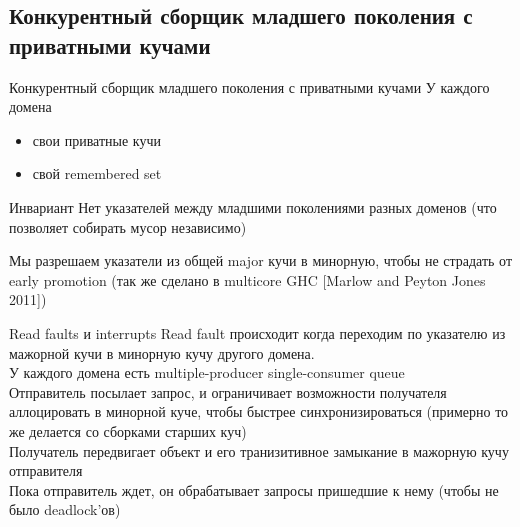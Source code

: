 \documentclass[aspectratio=169
  , xcolor={svgnames} 
  , hyperref={ colorlinks,citecolor=DeepPink4
             , linkcolor=DarkRed,urlcolor=DarkBlue}
  , russian
  ]{beamer}
\theoremstyle{exerciseStyle1}
\begin{document}
\subsection{Конкурентный сборщик младшего поколения с приватными кучами}

\begin{frame}{Конкурентный сборщик младшего поколения с приватными кучами}
У каждого домена 
\begin{itemize}
\item свои приватные кучи
\item свой remembered set
\end{itemize}

\begin{block}{Инвариант}
Нет указателей между младшими поколениями разных доменов 
(что позволяет собирать мусор независимо)
\end{block}

Мы разрешаем указатели из общей major кучи в минорную, чтобы не страдать от 
early promotion (так же сделано в multicore GHC [Marlow and Peyton Jones 2011])


\end{frame}

\begin{frame}{Read faults и interrupts}
Read fault происходит когда переходим по указателю из мажорной кучи в минорную кучу другого домена.\\

У каждого домена есть multiple-producer single-consumer queue\\

Отправитель посылает запрос, и ограничивает возможности получателя аллоцировать в минорной куче, чтобы быстрее синхронизироваться
(примерно то же делается со сборками старших куч)\\

Получатель передвигает объект и его транизитивное замыкание в мажорную кучу отправителя\\

Пока отправитель ждет, он обрабатывает запросы пришедшие к нему (чтобы не было deadlock'ов)

\end{frame}
\end{document}
